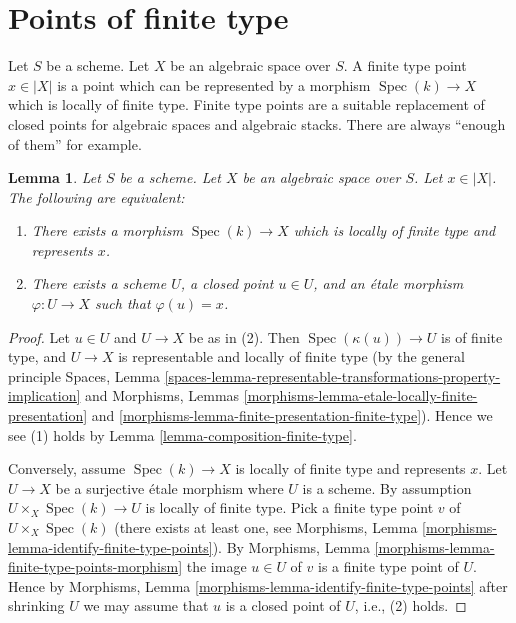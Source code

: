 \documentclass{stacks-project}
\theoremstyle{plain}
\newtheorem{lemma}[subsection]{Lemma}
\theoremstyle{definition}
\theoremstyle{remark}
\numberwithin{equation}{subsection}
\def\Spec{\mathop{\mathrm{Spec}}}
\begin{document}
\section{Points of finite type}
\label{section-points-finite-type}

\noindent
Let $S$ be a scheme. Let $X$ be an algebraic space over $S$.
A finite type point $x \in |X|$ is a point which can be represented by
a morphism $\Spec(k) \to X$ which is locally of finite type.
Finite type points are a suitable replacement of closed points for algebraic
spaces and algebraic stacks. There are always ``enough of them'' for example.

\begin{lemma}
\label{lemma-point-finite-type}
Let $S$ be a scheme. Let $X$ be an algebraic space over $S$.
Let $x \in |X|$. The following are equivalent:
\begin{enumerate}
\item There exists a morphism $\Spec(k) \to X$
which is locally of finite type and represents $x$.
\item There exists a scheme $U$, a closed point $u \in U$, and an \'etale
morphism $\varphi : U \to X$ such that $\varphi(u) = x$.
\end{enumerate}
\end{lemma}

\begin{proof}
Let $u \in U$ and $U \to X$ be as in (2). Then
$\Spec(\kappa(u)) \to U$ is of finite type, and $U \to X$ is
representable and locally of finite type (by the general principle
Spaces, Lemma
\ref{spaces-lemma-representable-transformations-property-implication}
and
Morphisms, Lemmas \ref{morphisms-lemma-etale-locally-finite-presentation} and
\ref{morphisms-lemma-finite-presentation-finite-type}). Hence we see
(1) holds by
Lemma \ref{lemma-composition-finite-type}.

\medskip\noindent
Conversely, assume $\Spec(k) \to X$ is locally of finite type and
represents $x$. Let $U \to X$ be a surjective \'etale morphism where $U$
is a scheme. By assumption $U \times_X \Spec(k) \to U$ is locally
of finite type. Pick a finite type point $v$ of
$U \times_X \Spec(k)$ (there exists at least one, see
Morphisms, Lemma \ref{morphisms-lemma-identify-finite-type-points}).
By
Morphisms, Lemma \ref{morphisms-lemma-finite-type-points-morphism}
the image $u \in U$ of $v$ is a finite type point of $U$.
Hence by
Morphisms, Lemma \ref{morphisms-lemma-identify-finite-type-points}
after shrinking $U$ we may assume that $u$ is a closed point of $U$, i.e.,
(2) holds.
\end{proof}
\end{document}
